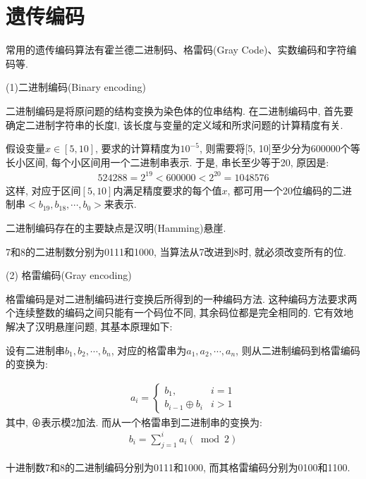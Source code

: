\section{遗传编码}

常用的遗传编码算法有霍兰德二进制码、格雷码(Gray Code)、实数编码和字符编码等.

(1)二进制编码(Binary encoding)

二进制编码是将原问题的结构变换为染色体的位串结构. 在二进制编码中, 首先要确定二进制字符串的长度l, 该长度与变量的定义域和所求问题的计算精度有关.
\begin{example}
假设变量$x\in [5,10]$, 要求的计算精度为$10^{-5}$, 则需要将[5, 10]至少分为600000个等长小区间, 每个小区间用一个二进制串表示. 于是, 串长至少等于20, 原因是:
\begin{align*}
  524288=2^{19}<600000<2^{20}=1048576
\end{align*}
这样, 对应于区间$[5,10]$内满足精度要求的每个值$x$, 都可用一个20位编码的二进制串$<b_{19},b_{18},\cdots,b_0>$来表示.
\end{example}

二进制编码存在的主要缺点是汉明(Hamming)悬崖.

\begin{example}
  7和8的二进制数分别为0111和1000, 当算法从7改进到8时, 就必须改变所有的位.
\end{example}

 (2) 格雷编码(Gray encoding)

格雷编码是对二进制编码进行变换后所得到的一种编码方法. 这种编码方法要求两个连续整数的编码之间只能有一个码位不同, 其余码位都是完全相同的. 它有效地解决了汉明悬崖问题, 其基本原理如下:

设有二进制串$b_1,b_2,\cdots,b_n$, 对应的格雷串为$a_1,a_2,\cdots,a_n$, 则从二进制编码到格雷编码的变换为:

\begin{align}
  a_{i}=\left\{\begin{array}{ll}{b_{1},} & {i=1} \\ {b_{i-1} \oplus b_{i}} & {i>1}\end{array}\right.
\end{align}
其中, ⊕表示模2加法. 而从一个格雷串到二进制串的变换为:
\begin{align}
  b_{i}=\sum_{j=1}^{i} a_{i}(\bmod 2)
\end{align}
\begin{example}
  十进制数7和8的二进制编码分别为0111和1000, 而其格雷编码分别为0100和1100.
\end{example}


